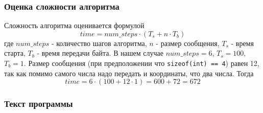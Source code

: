 \subsubsection*{Оценка сложности алгоритма}
Сложность алгоритма оценивается формулой
$$
time = num\_steps \cdot \left( T_s + n \cdot T_b \right)
$$
где $num\_steps$ - количество шагов алгоритма, $n$ - размер сообщения, $T_s$ - время старта, $T_b$ - время передачи байта. В нашем случае $num\_steps = 6$, $T_s = 100$, $T_b = 1$. Размер сообщения (при предположении что \texttt{sizeof(int) == 4}) равен 12, так как помимо самого числа надо передать и координаты, что два числа. Тогда
$$
time = 6 \cdot \left( 100 + 12 \cdot 1 \right) = 600 + 72 = 672
$$

\subsubsection*{Текст программы}
\inputminted{c}{../task-1/main.c}